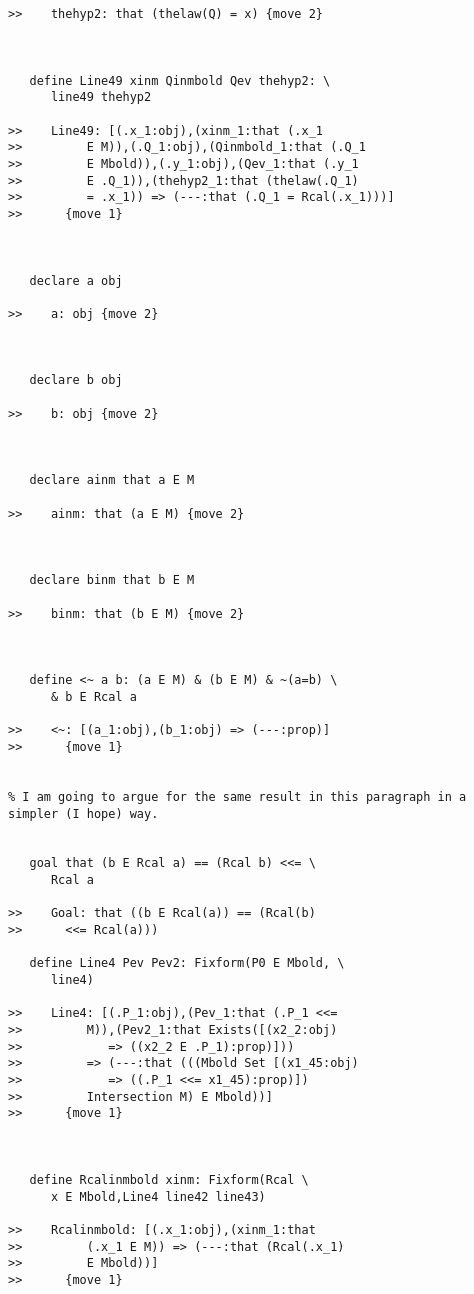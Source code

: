 \documentclass[12pt]{article}
\begin{document}
\begin{verbatim}
>>    thehyp2: that (thelaw(Q) = x) {move 2}



   define Line49 xinm Qinmbold Qev thehyp2: \
      line49 thehyp2

>>    Line49: [(.x_1:obj),(xinm_1:that (.x_1
>>         E M)),(.Q_1:obj),(Qinmbold_1:that (.Q_1
>>         E Mbold)),(.y_1:obj),(Qev_1:that (.y_1
>>         E .Q_1)),(thehyp2_1:that (thelaw(.Q_1)
>>         = .x_1)) => (---:that (.Q_1 = Rcal(.x_1)))]
>>      {move 1}



   declare a obj

>>    a: obj {move 2}



   declare b obj

>>    b: obj {move 2}



   declare ainm that a E M

>>    ainm: that (a E M) {move 2}



   declare binm that b E M

>>    binm: that (b E M) {move 2}



   define <~ a b: (a E M) & (b E M) & ~(a=b) \
      & b E Rcal a

>>    <~: [(a_1:obj),(b_1:obj) => (---:prop)]
>>      {move 1}


% I am going to argue for the same result in this paragraph in a simpler (I hope) way.


   goal that (b E Rcal a) == (Rcal b) <<= \
      Rcal a

>>    Goal: that ((b E Rcal(a)) == (Rcal(b)
>>      <<= Rcal(a)))

   define Line4 Pev Pev2: Fixform(P0 E Mbold, \
      line4)

>>    Line4: [(.P_1:obj),(Pev_1:that (.P_1 <<=
>>         M)),(Pev2_1:that Exists([(x2_2:obj)
>>            => ((x2_2 E .P_1):prop)]))
>>         => (---:that (((Mbold Set [(x1_45:obj)
>>            => ((.P_1 <<= x1_45):prop)])
>>         Intersection M) E Mbold))]
>>      {move 1}



   define Rcalinmbold xinm: Fixform(Rcal \
      x E Mbold,Line4 line42 line43)

>>    Rcalinmbold: [(.x_1:obj),(xinm_1:that
>>         (.x_1 E M)) => (---:that (Rcal(.x_1)
>>         E Mbold))]
>>      {move 1}




\end{verbatim}
\end{document}
